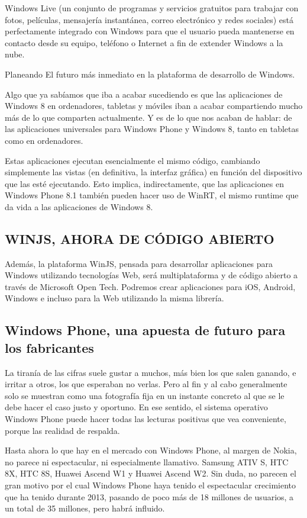 Windows Live (un conjunto de programas y servicios gratuitos para trabajar con fotos, películas, mensajería instantánea, correo electrónico y redes sociales) está 
perfectamente integrado con Windows para que el usuario pueda mantenerse en contacto desde su equipo, teléfono o Internet a fin de extender Windows a la nube.

Planeando El futuro más inmediato en la plataforma de desarrollo de Windows.
 
Algo que ya sabíamos que iba a acabar sucediendo es que las aplicaciones de Windows 8 en ordenadores, tabletas y móviles iban a acabar compartiendo mucho más de lo que 
comparten actualmente. Y es de lo que nos acaban de hablar: de las aplicaciones universales para Windows Phone y Windows 8, tanto en tabletas como en ordenadores.

Estas aplicaciones ejecutan esencialmente el mismo código, cambiando simplemente las vistas (en definitiva, la interfaz gráfica) en función del dispositivo que las esté 
ejecutando. Esto implica, indirectamente, que las aplicaciones en Windows Phone 8.1 también pueden hacer uso de WinRT, el mismo runtime que da vida a las aplicaciones de 
Windows 8.

\subsection*{WINJS, AHORA DE CÓDIGO ABIERTO}
Además, la plataforma WinJS, pensada para desarrollar aplicaciones para Windows utilizando tecnologías Web, será multiplataforma y de código abierto a través de Microsoft 
Open Tech. Podremos crear aplicaciones para iOS, Android, Windows e incluso para la Web utilizando la misma librería.

\subsection*{Windows Phone, una apuesta de futuro para los fabricantes}
La tiranía de las cifras suele gustar a muchos, más bien los que salen ganando, e irritar a otros, los que esperaban no verlas. Pero al fin y al cabo generalmente solo se 
muestran como una fotografía fija en un instante concreto al que se le debe hacer el caso justo y oportuno. En ese sentido, el sistema operativo Windows Phone puede hacer 
todas las lecturas positivas que vea conveniente, porque las realidad de respalda.

Hasta ahora lo que hay en el mercado con Windows Phone, al margen de Nokia, no parece ni espectacular, ni especialmente llamativo. Samsung ATIV S, HTC 8X, HTC 8S, Huawei 
Ascend W1 y Huawei Ascend W2. Sin duda, no parecen el gran motivo por el cual Windows Phone haya tenido el espectacular crecimiento que ha tenido durante 2013, pasando de 
poco más de 18 millones de usuarios, a un total de 35 millones, pero habrá influido.

